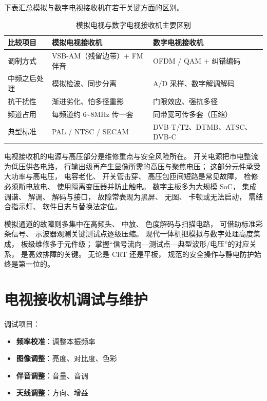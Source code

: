 下表汇总模拟与数字电视接收机在若干关键方面的区别。

\begin{table}[htbp]
\centering
\caption{模拟电视与数字电视接收机主要区别}
\begin{tabular}{|p{4.2cm}|p{5.4cm}|p{5.4cm}|}
\hline
\textbf{比较项目} & \textbf{模拟电视接收机} & \textbf{数字电视接收机} \\
\hline
调制方式 & VSB-AM（残留边带）+ FM 伴音 & OFDM / QAM + 纠错编码 \\
\hline
中频之后处理 & 模拟检波、同步分离 & A/D 采样、数字解调解码 \\
\hline
抗干扰性 & 渐进劣化、怕多径重影 & 门限效应、强抗多径 \\
\hline
频道占用 & 每频道约 6\sim8MHz 传一套 & 同带宽可传多套（压缩） \\
\hline
典型标准 & PAL / NTSC / SECAM & DVB-T/T2、DTMB、ATSC、DVB-C \\
\hline
\end{tabular}
\end{table}

电视接收机的电源与高压部分是维修重点与安全风险所在。
开关电源把市电整流为低压供各电路，
行输出级再产生显像所需的高压与聚焦电压；
这部分元件承受大功率与高电压，
电容老化、
开关管击穿、
高压包匝间短路是常见故障，
检修必须断电放电、
使用隔离变压器并防止触电。
数字主板多为大规模 SoC，
集成调谐、
解调、
解码与接口，
故障常表现为黑屏、
无图、
卡顿或无法启动，
需结合指示灯、
软件日志与替换法定位。

模拟通道的故障则多集中在高频头、
中放、
色度解码与扫描电路，
可借助标准彩条信号、
示波器观测关键测试点逐级压缩。
现代一体机把模拟与数字处理高度集成，
板级维修多于元件级；
掌握“信号流向—测试点—典型波形/电压”的对应关系，
是高效排障的关键。
无论是 CRT 还是平板，
规范的安全操作与静电防护始终是第一位的。

\section{电视接收机调试与维护}
\label{sec:tv_receiver_maintenance}

调试项目：
\begin{itemize}
    \item \textbf{频率校准}：调整本振频率
    \item \textbf{图像调整}：亮度、对比度、色彩
    \item \textbf{伴音调整}：音量、音调
    \item \textbf{天线调整}：方向、增益
\end{itemize}

